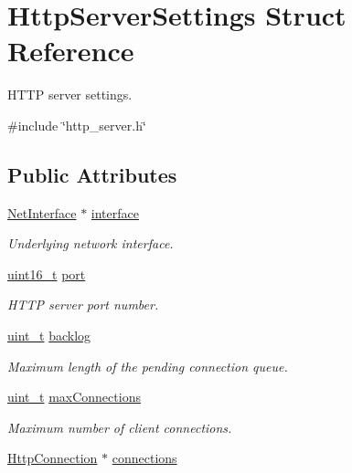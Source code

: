 \hypertarget{structHttpServerSettings}{}\section{Http\+Server\+Settings Struct Reference}
\label{structHttpServerSettings}


H\+T\+TP server settings.  




{\ttfamily \#include \char`\"{}http\+\_\+server.\+h\char`\"{}}

\subsection*{Public Attributes}
\begin{DoxyCompactItemize}
\item 
\hyperlink{net_8h_a2234db8911a1148c9159979d8f5e0d6b}{Net\+Interface} $\ast$ \hyperlink{structHttpServerSettings_a6bbe22548511f1840919ccb1a2de54dc}{interface}
\begin{DoxyCompactList}\small\item\em Underlying network interface. \end{DoxyCompactList}\item 
\hyperlink{stdint_8h_a273cf69d639a59973b6019625df33e30}{uint16\+\_\+t} \hyperlink{structHttpServerSettings_ac25483ccae9ee68803c66c74106b0488}{port}
\begin{DoxyCompactList}\small\item\em H\+T\+TP server port number. \end{DoxyCompactList}\item 
\hyperlink{compiler__port_8h_a12a1e9b3ce141648783a82445d02b58d}{uint\+\_\+t} \hyperlink{structHttpServerSettings_aa05118aaa9c4c355bc8c3c95ece110c9}{backlog}
\begin{DoxyCompactList}\small\item\em Maximum length of the pending connection queue. \end{DoxyCompactList}\item 
\hyperlink{compiler__port_8h_a12a1e9b3ce141648783a82445d02b58d}{uint\+\_\+t} \hyperlink{structHttpServerSettings_a156347727039cb538dc3c2d966517590}{max\+Connections}
\begin{DoxyCompactList}\small\item\em Maximum number of client connections. \end{DoxyCompactList}\item 
\hyperlink{http__server_8h_a3506ecffde998ab02629dca83587d2f9}{Http\+Connection} $\ast$ \hyperlink{structHttpServerSettings_aa3f92614da4bf57aae294024618b66c1}{connections}

\end{DoxyCompactItemize}
